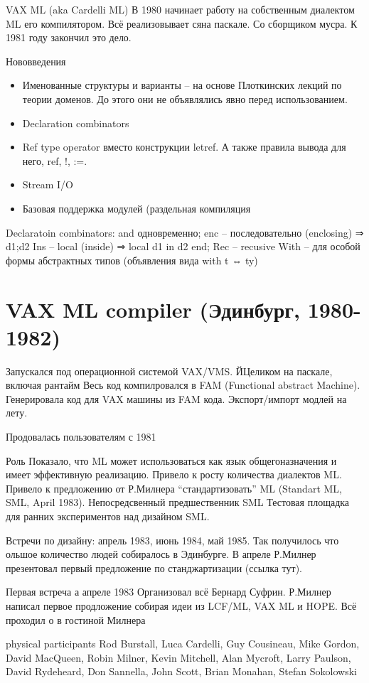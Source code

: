 \documentclass[14pt]{matmex-diploma-custom}
\begin{document}
VAX ML (aka Cardelli ML)
В 1980 начинает работу на собственным диалектом ML его компилятором. Всё реализовывает сяна паскале. Со сборщиком мусра. К 1981 году закончил это дело.

Нововведения
\begin{itemize}
 \item Именованные структуры и варианты -- на основе Плоткинских лекций по теории доменов.  До этого они не объявлялись явно перед использованием.
\item Declaration combinators
\item Ref type operator вместо конструкции letref. А также правила вывода для него, ref, !, :=.
\item Stream I/O
\item Базовая поддержка модулей (раздельная компиляция

\end{itemize}


Declaratoin combinators:
and одновременно;
enc -- последовательно (enclosing)  ⇒ d1;d2
Ins -- local (inside) ⇒ local d1 in d2 end;
Rec -- recusive
With -- для особой формы абстрактных типов (объявления вида with t ⇔ ty)

\chapter{VAX ML compiler (Эдинбург, 1980-1982)}
Запускался под операционной системой VAX/VMS.
ЙЦеликом на паскале, включая рантайм
Весь код компилровался в FAM (Functional abstract Machine).
Генерировала код для VAX машины из FAM кода.
Экспорт/импорт модлей на лету.

Продовалась пользователям с 1981

Роль
Показало, что ML может использоваться как язык общегоназначения и имеет эффективную реализацию. 
Привело к росту количества диалектов ML. Привело к предложению от Р.Милнера “стандартизовать” ML (Standart ML, SML, April 1983).
Непосредсвенный предшественник SML
Тестовая площадка для ранних экспериментов над дизайном SML.

 Встречи по дизайну: апрель 1983, июнь 1984, май 1985. Так получилось что ольшое количество людей собиралось в Эдинбурге. В апреле Р.Милнер презентовал первый предложение по станджартизации (ссылка тут). 

Первая встреча а апреле 1983
Организовал всё Бернард Суфрин. Р.Милнер написал первое продложение  собирая идеи из LCF/ML, VAX ML и HOPE. Всё проходил о в гостиной Милнера

physical participants
Rod Burstall, Luca Cardelli, Guy Cousineau, Mike Gordon, David MacQueen, Robin Milner, Kevin Mitchell, Alan Mycroft, Larry Paulson, David Rydeheard, Don Sannella, John Scott, Brian Monahan, Stefan Sokolowski
\end{document}
